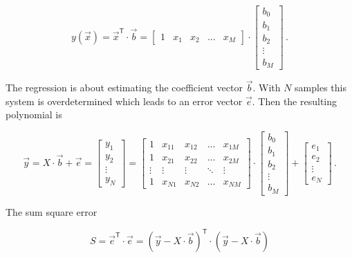 \begin{equation}
y\left(\vec{x}\right) = \vec{x}^{\mathsf T}\cdot\vec{b}=\begin{bmatrix}
1 & x_1 & x_2 & \dots & x_M
\end{bmatrix} \cdot \begin{bmatrix}
b_0 \\ b_1 \\ b_2 \\ \vdots \\ b_M
\end{bmatrix}\,.
\end{equation}

The regression is about estimating the coefficient vector $\vec{b}$. With $N$ samples this system is overdetermined which leads to an error vector $\vec{e}$. Then the resulting polynomial is

\begin{equation}
\vec{y}=X\cdot \vec{b}+\vec{e}=\begin{bmatrix}
y_1 \\ y_2 \\ \vdots \\ y_N
\end{bmatrix} = \begin{bmatrix}
1 & x_{11} & x_{12} & \dots & x_{1M} \\
1 & x_{21} & x_{22} & \dots & x_{2M} \\
\vdots & \vdots & \vdots & \ddots & \vdots \\
1 & x_{N1} & x_{N2} & \dots & x_{NM}
\end{bmatrix} \cdot \begin{bmatrix}
b_0 \\ b_1 \\ b_2 \\ \vdots \\ b_M
\end{bmatrix} + \begin{bmatrix}
e_1 \\ e_2 \\ \vdots \\ e_N
\end{bmatrix}\,.
\end{equation}

The sum square error

\begin{equation}
S = \vec{e}^{\mathsf T}\cdot\vec{e}=\left(\vec{y}-X\cdot\vec{b}\right)^{\mathsf T}\cdot\left(\vec{y}-X\cdot\vec{b}\right)
\end{equation}

